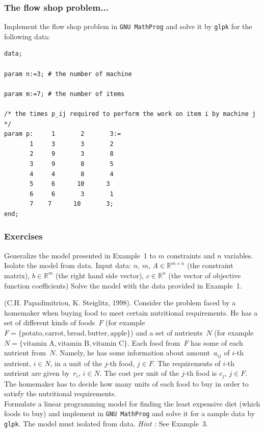\documentclass[landscape]{beamer}
\newcommand{\Rset}{{\mathbb{R}}}
\begin{document}
\begin{frame}[fragile]
  \frametitle{The flow shop problem...}  
\begin{footnotesize} 
Implement the flow shop problem  in \verb=GNU MathProg= 
and solve it  by 
\verb=glpk= for the following data:
\begin{tiny}
\begin{verbatim}
data;

param n:=3; # the number of machine

param m:=7; # the number of items

/* the times p_ij required to perform the work on item i by machine j */
param p:     1       2       3:=
       1     3       3       2
       2     9       3       8
       3     9       8       5
       4     4       8       4
       5     6      10      3
       6     6       3       1
       7    7      10       3;       
end;
\end{verbatim}
\end{tiny}



\end{footnotesize}
\end{frame}


\begin{frame}[fragile]
\vspace{-0.2cm}
  \frametitle{Exercises}
\begin{footnotesize}
 Generalize the model presented in Example~1 to $m$ constraints and $n$ variables. Isolate  the model from data. Input data: $n$, $m$, $A\in \Rset^{m\times n}$ (the 
constraint matrix),
$b\in \Rset^m$ (the right  hand side vector), $c\in \Rset^n$ (the vector of objective function coefficients) 
Solve the model with the data provided in Example~1.

(C.H. Papadimitriou, K. Steiglitz, 1998).
Consider  the problem  faced by a homemaker when buying food to
meet certain nutritional
requirements.  He has a set of different kinds of foods~$F$ (for example $F=\{\text{potato}, \text{carrot},  \text{bread}, \text{butter},
\text{apple}\}$) and a set of nutrients~$N$ (for example~$N=\{\text{vitamin A}, \text{vitamin B}, 
\text{vitamin C}\}$.
Each food from~$F$ has some of each  nutrient from~$N$. Namely,
he has some information about amount~$a_{ij}$  of $i$-th nutrient, $i\in N$, in a unit of
the $j$-th food, $j\in F$. The   requirements of $i$-th nutrient are given by~$r_i$, $i\in N$.
The cost per unit of the $j$-th food is $c_j$, $j\in F$.
The homemaker has to decide   how many units of each food to buy in order
to satisfy the nutritional requirements.\\
Formulate a  linear programming model for finding 
the least expensive diet (which foods to buy)
and implement in \verb=GNU MathProg= 
and solve it for a sample data by 
\verb=glpk=. 
The model must isolated
from data. \emph{Hint :} See Example~3.
\end{footnotesize}  
\end{frame}
\end{document}
